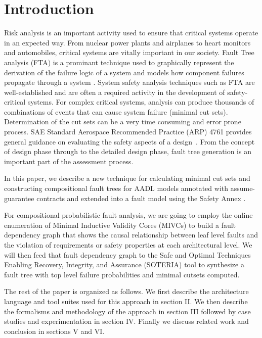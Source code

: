 \section{Introduction}
\label{sec:intro}

Risk analysis is an important activity used to ensure that critical systems operate in an expected way. From nuclear power plants and airplanes to heart monitors and automobiles, critical systems are vitally important in our society. Fault Tree analysis (FTA) is a prominant technique used to graphically represent the derivation of the failure logic of a system and models how component failures propagate through a system \cite{0f356f05e72f43018211b36f97c8854a}. System safety analysis techniques such as FTA are well-established and are often a required activity in the development of safety-critical systems. For complex critical systems, analysis can produce thousands of combinations of events that can cause system failure (minimal cut sets). Determination of the cut sets can be a very time consuming and error prone process. SAE Standard Aerospace Recommended Practice (ARP) 4761 provides general guidance on evaluating the safety aspects of a design~\cite{SAE:ARP4761}. From the concept of design phase through to the detailed design phase, fault tree generation is an important part of the assessment process.  

In this paper, we describe a new technique for calculating minimal cut sets and constructing compositional fault trees for AADL models \cite{AADL_Standard} annotated with assume-guarantee contracts \cite{QFCS15:backes} and extended into a fault model using the Safety Annex \cite{Stewart17:IMBSA,SATechReport}. 

For compositional probabilistic fault analysis, we are going to employ the online enumeration of Minimal Inductive Validity Cores (MIVCs) \cite{GhassabaniGW16,Ghassabani2017EfficientGO} to build a fault dependency graph that shows the causal relationship between leaf level faults and the violation of requirements or safety properties at each architectural level.  We will then feed that fault dependency graph to the Safe and Optimal Techniques Enabling Recovery, Integrity, and Assurance (SOTERIA) tool \cite{SOTERIAproject} to synthesize a fault tree with top level failure probabilities and minimal cutsets computed. 

The rest of the paper is organized as follows. We first describe the architecture language and tool suites used for this approach in section II. We then describe the formalisms and methodology of the approach in section III followed by case studies and experimentation in section IV. Finally we discuss related work and conclusion in sections V and VI.  
